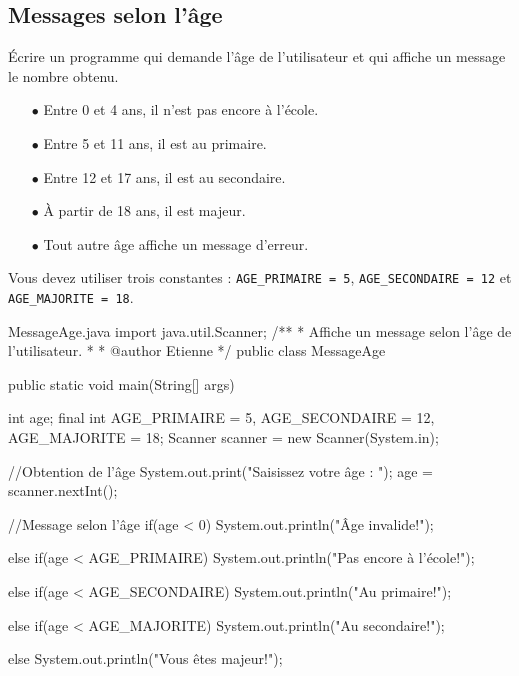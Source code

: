 \documentclass[12pt]{article}
\begin{document}
\subsection{Messages selon l'âge}

Écrire un programme qui demande l'âge de l'utilisateur et qui affiche un message le nombre obtenu. 

\begin{itemize}
	\item[$\bullet$] Entre 0 et 4 ans, il n'est pas encore à l'école.
	\item[$\bullet$] Entre 5 et 11 ans, il est au primaire.
	\item[$\bullet$] Entre 12 et 17 ans, il est au secondaire.
	\item[$\bullet$] À partir de 18 ans, il est majeur.
	\item[$\bullet$] Tout autre âge affiche un message d'erreur.
\end{itemize}

Vous devez utiliser trois constantes : \verb|AGE_PRIMAIRE = 5|, \verb|AGE_SECONDAIRE = 12| et \verb|AGE_MAJORITE = 18|.


\begin{MyTCB}{MessageAge.java}
import java.util.Scanner;
/**
 * Affiche un message selon l'âge de l'utilisateur.
 * 
 * @author Etienne
 */
public class MessageAge {

	public static void main(String[] args) {
		
		int age;
		final int AGE_PRIMAIRE = 5, AGE_SECONDAIRE = 12, AGE_MAJORITE = 18;
		Scanner scanner = new Scanner(System.in);
		
		//Obtention de l'âge
		System.out.print("Saisissez votre âge : ");
		age = scanner.nextInt();
		
		//Message selon l'âge
		if(age < 0)
			System.out.println("Âge invalide!");
		
		else if(age < AGE_PRIMAIRE)
			System.out.println("Pas encore à l'école!");
		
		else if(age < AGE_SECONDAIRE)
			System.out.println("Au primaire!");
		
		else if(age < AGE_MAJORITE)
			System.out.println("Au secondaire!");
		
		else
			System.out.println("Vous êtes majeur!");
		
	}

}
\end{MyTCB}
\end{document}
